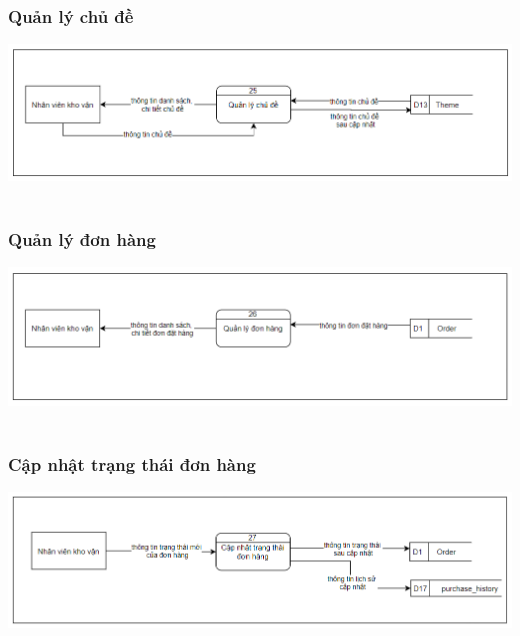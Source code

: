 \documentclass[12pt,a4paper,2sides]{report}
\begin{document}
\subsubsection{Quản lý chủ đề}
    \includegraphics[width=1\linewidth]{lib/DFD/quanlychude.png}\\\vspace*{1cm}    
    \hspace{5cm}{Hình 21. Quản lý chủ đề}\\
\subsubsection{Quản lý đơn hàng}
    \includegraphics[width=1\linewidth]{lib/DFD/quanlydonhang.png}\\\vspace*{1cm} 
    \hspace{5cm}{Hình 21. Quản lý đơn hàng}\\
\subsubsection{Cập nhật trạng thái đơn hàng}
    \includegraphics[width=1\linewidth]{lib/DFD/capnhattrangthaidh.png}\\\vspace*{1cm} 
    \hspace{4cm}{Hình 22. Cập nhật trạng thái đơn hàng}\\
\end{document}
